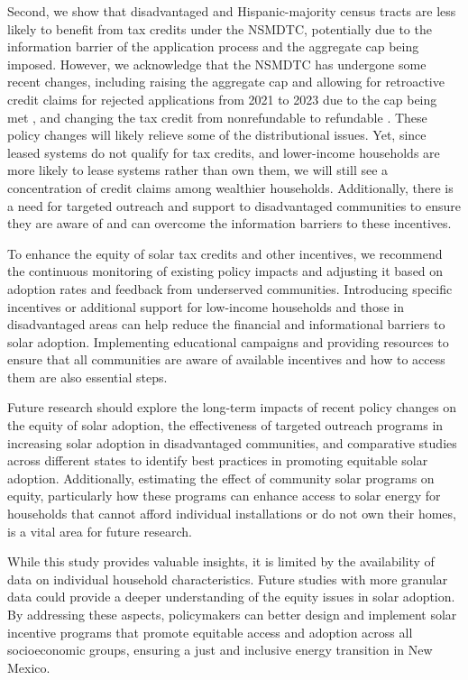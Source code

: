 \documentclass[11pt,twoside,letterpaper]{article}
\begin{document}
Second, we show that disadvantaged and Hispanic-majority census tracts are less likely to benefit from tax credits under the NSMDTC, potentially due to the information barrier of the application process and the aggregate cap being imposed. However, we acknowledge that the NSMDTC has undergone some recent changes, including raising the aggregate cap and allowing for retroactive credit claims for rejected applications from 2021 to 2023 due to the cap being met \parencite{newsolarcap}, and changing the tax credit from nonrefundable to refundable \parencite{nmsmdtc}. These policy changes will likely relieve some of the distributional issues. Yet, since leased systems do not qualify for tax credits, and lower-income households are more likely to lease systems rather than own them, we will still see a concentration of credit claims among wealthier households. Additionally, there is a need for targeted outreach and support to disadvantaged communities to ensure they are aware of and can overcome the information barriers to these incentives.

To enhance the equity of solar tax credits and other incentives, we recommend the continuous monitoring of existing policy impacts and adjusting it based on adoption rates and feedback from underserved communities. Introducing specific incentives or additional support for low-income households and those in disadvantaged areas can help reduce the financial and informational barriers to solar adoption. Implementing educational campaigns and providing resources to ensure that all communities are aware of available incentives and how to access them are also essential steps. 

Future research should explore the long-term impacts of recent policy changes on the equity of solar adoption, the effectiveness of targeted outreach programs in increasing solar adoption in disadvantaged communities, and comparative studies across different states to identify best practices in promoting equitable solar adoption. Additionally, estimating the effect of community solar programs on equity, particularly how these programs can enhance access to solar energy for households that cannot afford individual installations or do not own their homes, is a vital area for future research.


While this study provides valuable insights, it is limited by the availability of data on individual household characteristics. Future studies with more granular data could provide a deeper understanding of the equity issues in solar adoption. By addressing these aspects, policymakers can better design and implement solar incentive programs that promote equitable access and adoption across all socioeconomic groups, ensuring a just and inclusive energy transition in New Mexico.
\end{document}
